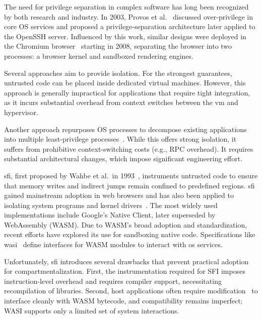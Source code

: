 The need for privilege separation in complex software has long been recognized by both research and industry.
In 2003, Provos et al.~\cite{provos2003preventing} discussed over-privilege in core OS services and proposed a privilege-separation architecture later applied to the OpenSSH server.
Influenced by this work, similar designs were deployed in the Chromium browser~\cite{barth2008security} starting in 2008, separating the browser into two processes: a browser kernel and sandboxed rendering engines.



Several approaches aim to provide isolation.
For the strongest guarantees, untrusted code can be placed inside dedicated virtual machines.
However, this approach is generally impractical for applications that require tight integration, as it incurs substantial overhead from context switches between the \gls{vm} and hypervisor.

Another approach repurposes OS processes to decompose existing applications into multiple least-privilege processes~\cite{privtrans}.
While this offers strong isolation, it suffers from prohibitive context-switching costs (e.g., RPC overhead). It requires substantial architectural changes, which impose significant engineering effort.

\gls{sfi}, first proposed by Wahbe et al.\ in 1993~\cite{wahbe_efficient_1993}, instruments untrusted code to ensure that memory writes and indirect jumps remain confined to predefined regions.
\gls{sfi} gained mainstream adoption in web browsers and has also been applied to isolating system programs and kernel drivers~\cite{mao2011software,castro_fast_2009}.
The most widely used implementations include Google's Native Client, later superseded by WebAssembly (WASM).
Due to WASM's broad adoption and standardization, recent efforts have explored its use for sandboxing native code.
Specifications like \gls{wasi}~\cite{wasi} define interfaces for WASM modules to interact with \gls{os} services.

Unfortunately, \gls{sfi} introduces several drawbacks that prevent practical adoption for compartmentalization.
First, the instrumentation required for SFI imposes instruction-level overhead and requires compiler support, necessitating recompilation of libraries.
Second, host applications often require modification~\cite{rlbox} to interface cleanly with WASM bytecode, and compatibility remains imperfect; WASI supports only a limited set of system interactions.

